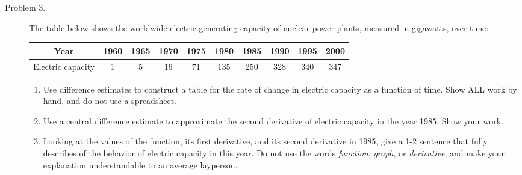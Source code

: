 \documentclass[addpoints]{exam}
\begin{document}
\begin{description}
\hrulefill


	\item[Problem 3.] The table below shows the worldwide electric generating capacity of nuclear power plants, measured in gigawatts, over time: 
	\begin{center}
		\begin{tabular}{c||c|c|c|c|c|c|c|c|c}
		Year & 1960 & 1965 & 1970 & 1975 & 1980 & 1985 & 1990 & 1995 & 2000 \\ \hline
		Electric capacity & 1 & 5 & 16 & 71 & 135 & 250 & 328 & 340 & 347 
		\end{tabular}
	\end{center}
	\begin{enumerate}
		\item Use difference estimates to construct a table for the rate of change in electric capacity as a function of time. Show ALL work by hand, and do not use a spreadsheet. 
		\item Use a central difference estimate to approximate the second derivative of electric capacity in the year 1985. Show your work. 
		\item Looking at the values of the function, its first derivative, and its second derivative in 1985, give a 1-2 sentence that fully describes of the behavior of electric capacity in this year. Do not use the words \emph{function}, \emph{graph}, or \emph{derivative}, and make your explanation understandable to an average layperson. 
	\end{enumerate}


\end{description}
\end{document}
